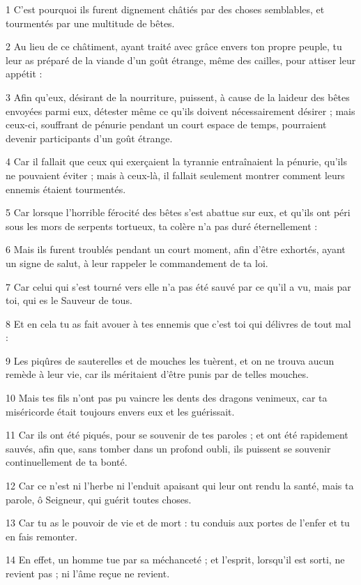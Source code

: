 \par 1 C'est pourquoi ils furent dignement châtiés par des choses semblables, et tourmentés par une multitude de bêtes.
\par 2 Au lieu de ce châtiment, ayant traité avec grâce envers ton propre peuple, tu leur as préparé de la viande d'un goût étrange, même des cailles, pour attiser leur appétit :
\par 3 Afin qu'eux, désirant de la nourriture, puissent, à cause de la laideur des bêtes envoyées parmi eux, détester même ce qu'ils doivent nécessairement désirer ; mais ceux-ci, souffrant de pénurie pendant un court espace de temps, pourraient devenir participants d'un goût étrange.
\par 4 Car il fallait que ceux qui exerçaient la tyrannie entraînaient la pénurie, qu'ils ne pouvaient éviter ; mais à ceux-là, il fallait seulement montrer comment leurs ennemis étaient tourmentés.
\par 5 Car lorsque l'horrible férocité des bêtes s'est abattue sur eux, et qu'ils ont péri sous les mors de serpents tortueux, ta colère n'a pas duré éternellement :
\par 6 Mais ils furent troublés pendant un court moment, afin d'être exhortés, ayant un signe de salut, à leur rappeler le commandement de ta loi.
\par 7 Car celui qui s'est tourné vers elle n'a pas été sauvé par ce qu'il a vu, mais par toi, qui es le Sauveur de tous.
\par 8 Et en cela tu as fait avouer à tes ennemis que c'est toi qui délivres de tout mal :
\par 9 Les piqûres de sauterelles et de mouches les tuèrent, et on ne trouva aucun remède à leur vie, car ils méritaient d'être punis par de telles mouches.
\par 10 Mais tes fils n'ont pas pu vaincre les dents des dragons venimeux, car ta miséricorde était toujours envers eux et les guérissait.
\par 11 Car ils ont été piqués, pour se souvenir de tes paroles ; et ont été rapidement sauvés, afin que, sans tomber dans un profond oubli, ils puissent se souvenir continuellement de ta bonté.
\par 12 Car ce n'est ni l'herbe ni l'enduit apaisant qui leur ont rendu la santé, mais ta parole, ô Seigneur, qui guérit toutes choses.
\par 13 Car tu as le pouvoir de vie et de mort : tu conduis aux portes de l'enfer et tu en fais remonter.
\par 14 En effet, un homme tue par sa méchanceté ; et l'esprit, lorsqu'il est sorti, ne revient pas ; ni l'âme reçue ne revient.
